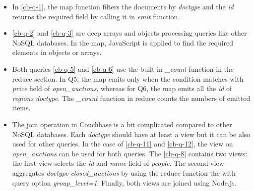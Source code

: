  \begin{itemize}
 \item  In \ref{cb-q-1}, the map function filters the documents by \textit{doctype} and the \textit{id} returns the required field by calling it in \textit{emit} function.
 
 \item \ref{cb-q-2} and \ref{cb-q-3} are deep arrays and objects processing queries like other NoSQL databases. In the map,  JavaScript is applied  to find the required elements in objects or arrays.
 
 \item Both queries \ref{cb-q-5} and \ref{cb-q-6} use the built-in \textit{\_count} function  in the reduce section.  In Q5, the map emits only when the condition matches with \textit{price} field of \textit{open\_auctions}, whereas for Q6, the map
 emits all the \textit{id} of \textit{regions} \textit{doctype}.  The \textit{\_count} function in reduce counts the numbers of emitted items. 
 \item The join operation in Couchbase is a bit complicated compared to other NoSQL databases. Each \textit{doctype} should have at least a view but it can be also used for other queries. In the case of \ref{cb-q-11} and \ref{cb-q-12}, the view on \textit{open\_auctions} can be used for both queries. The \ref{cb-q-8} contains two views: the first view selects the \textit{id} and \textit{name} field of \textit{people}. The second view aggregates \textit{doctype} \textit{closed\_auctions} by using the reduce function the with query option \textit{group\_level=1}. Finally, both views are joined using Node.js. 
 

\end{itemize}
